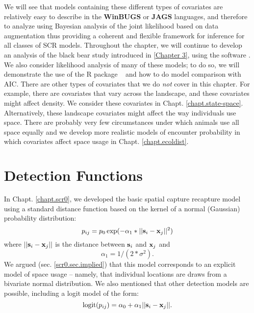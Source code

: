 We will see that models containing these different types of
covariates are relatively easy to describe in the {\bf WinBUGS} or
{\bf JAGS} languages, and
therefore to analyze using Bayesian analysis of the joint likelihood
based on data augmentation thus providing a coherent and flexible
framework for inference for all classes of SCR models.  Throughout the
chapter, we will continue to develop an analysis of the black bear
study introduced in \ref{Chapter 3}, using the software
\jags.  We also
consider likelihood analysis of many of these models; to do so, we
will demonstrate the use of the R package \secr~ and how to do model
comparison with AIC.
There are other types of covariates that we do {\it not} cover in this
chapter. For example, there are covariates that vary across the
landscape, and these covariates
might affect density. We consider these covariates in
Chapt. \ref{chapt.state-space}.
Alternatively, these landscape covariates might affect the way individuals use
space. There are probably very few circumstances under which animals use all space equally and we develop more realistic models of encounter
probability in which covariates affect space usage in Chapt. \ref{chapt.ecoldist}.


\section{Detection Functions}

In Chapt. \ref{chapt.scr0}, we developed the basic spatial capture
recapture model using a standard distance function based on the kernel
of a normal (Gaussian) probability distribution:
\[
p_{ij} = p_{0} \exp(-\alpha_{1} *||{\bf s}_{i}-{\bf x}_{j}||^2)
\]
where $||{\bf s}_{i}-{\bf x}_{j}||$ is the distance between ${\bf
  s}_{i}$ and ${\bf x}_{j}$ and
\[
\alpha_{1} = 1/(2*\sigma^2).
\]
We argued (sec. \ref{scr0.sec.implied}) that this model corresponds to
an explicit model of space usage -- namely, that individual locations
are draws from a bivariate normal distribution. We also mentioned that
other detection models are possible, including a logit model of the
form:
\begin{equation}
	\mbox{logit}(p_{ij}) = \alpha_{0} + \alpha_1 ||{\bf s}_{i}-{\bf x}_{j} ||.
\label{covariates.eq.logit}
\end{equation}

